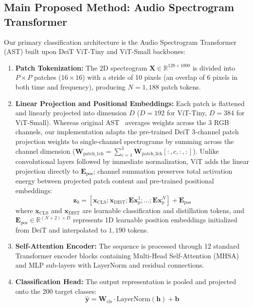 \documentclass[11pt,a4paper]{article}
\begin{document}
\subsection{Main Proposed Method: Audio Spectrogram Transformer}
Our primary classification architecture is the Audio Spectrogram Transformer (AST) built upon DeiT ViT-Tiny and ViT-Small backbones:
\begin{enumerate}
    \item \textbf{Patch Tokenization:} The 2D spectrogram $\mathbf{X} \in \mathbb{R}^{128 \times 1000}$ is divided into $P \times P$ patches ($16 \times 16$) with a stride of 10 pixels (an overlap of $6$ pixels in both time and frequency), producing $N = 1,188$ patch tokens.
    \item \textbf{Linear Projection and Positional Embeddings:} Each patch is flattened and linearly projected into dimension $D$ ($D=192$ for ViT-Tiny, $D=384$ for ViT-Small). Whereas original AST~\cite{gong2021ast} averages weights across the 3 RGB channels, our implementation adapts the pre-trained DeiT 3-channel patch projection weights to single-channel spectrograms by summing across the channel dimension ($\mathbf{W}_{\text{patch\_1ch}} = \sum_{c=1}^3 \mathbf{W}_{\text{patch\_3ch}}[:, c, :, :]$). Unlike convolutional layers followed by immediate normalization, ViT adds the linear projection directly to $\mathbf{E}_{\text{pos}}$; channel summation preserves total activation energy between projected patch content and pre-trained positional embeddings:
    \begin{equation}
        \mathbf{z}_0 = [\mathbf{x}_{\text{CLS}}; \mathbf{x}_{\text{DIST}}; \mathbf{E}\mathbf{x}_p^1; \dots; \mathbf{E}\mathbf{x}_p^N] + \mathbf{E}_{\text{pos}}
    \end{equation}
    where $\mathbf{x}_{\text{CLS}}$ and $\mathbf{x}_{\text{DIST}}$ are learnable classification and distillation tokens, and $\mathbf{E}_{\text{pos}} \in \mathbb{R}^{(N+2) \times D}$ represents 1D learnable position embeddings initialized from DeiT and interpolated to $1,190$ tokens.
    \item \textbf{Self-Attention Encoder:} The sequence is processed through 12 standard Transformer encoder blocks containing Multi-Head Self-Attention (MHSA) and MLP sub-layers with LayerNorm and residual connections.
    \item \textbf{Classification Head:} The output representation is pooled and projected onto the 200 target classes:
    \begin{equation}
        \hat{\mathbf{y}} = \mathbf{W}_{\text{cls}} \cdot \text{LayerNorm}(\mathbf{h}) + \mathbf{b}
    \end{equation}
\end{enumerate}
\end{document}
